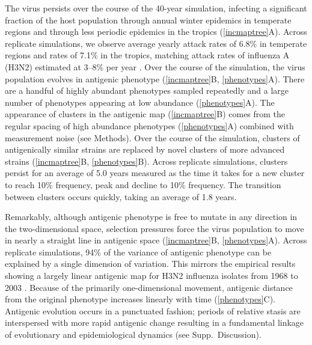 The virus persists over the course of the 40-year simulation, infecting a significant fraction of the host population through annual winter epidemics in temperate regions and through less periodic epidemics in the tropics (\ref{incmaptree}A).  Across replicate simulations, we observe average yearly attack rates of 6.8\% in temperate regions and rates of 7.1\% in the tropics, matching attack rates of influenza A (H3N2) estimated at 3--8\% per year \cite{Monto93,Koelle09}.  Over the course of the simulation, the virus population evolves in antigenic phenotype (\ref{incmaptree}B, \ref{phenotypes}A).  There are a handful of highly abundant phenotypes sampled repeatedly and a large number of phenotypes appearing at low abundance (\ref{phenotypes}A).  The appearance of clusters in the antigenic map (\ref{incmaptree}B) comes from the regular spacing of high abundance phenotypes (\ref{phenotypes}A) combined with measurement noise (see Methods).  Over the course of the simulation, clusters of antigenically similar strains are replaced by novel clusters of more advanced strains (\ref{incmaptree}B, \ref{phenotypes}B).  Across replicate simulations, clusters persist for an average of 5.0 years measured as the time it takes for a new cluster to reach 10\% frequency, peak and decline to 10\% frequency.  The transition between clusters occurs quickly, taking an average of 1.8 years.

Remarkably, although antigenic phenotype is free to mutate in any direction in the two-dimensional space, selection pressures force the virus population to move in nearly a straight line in antigenic space (\ref{incmaptree}B, \ref{phenotypes}A).  Across replicate simulations, 94\% of the variance of antigenic phenotype can be explained by a single dimension of variation.  This mirrors the empirical results showing a largely linear antigenic map for H3N2 influenza isolates from 1968 to 2003 \cite{Smith04}.  Because of the primarily one-dimensional movement, antigenic distance from the original phenotype increases linearly with time (\ref{phenotypes}C).  Antigenic evolution occurs in a punctuated fashion; periods of relative stasis are interspersed with more rapid antigenic change resulting in a fundamental linkage of evolutionary and epidemiological dynamics (see Supp.~Discussion).

